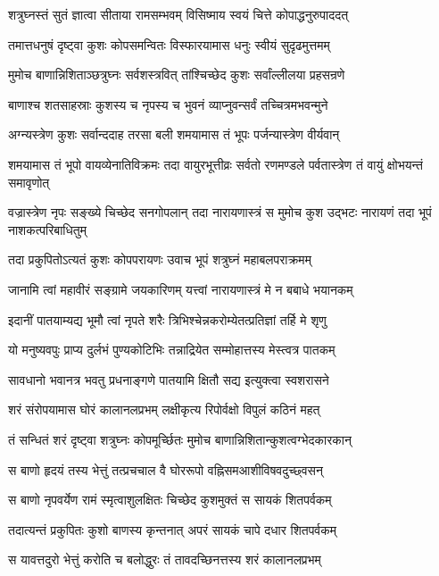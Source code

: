 \twolineshloka
{शत्रुघ्नस्तं सुतं ज्ञात्वा सीताया रामसम्भवम्}
{विसिष्माय स्वयं चित्ते कोपाद्धनुरुपाददत्}%

\twolineshloka
{तमात्तधनुषं दृष्ट्वा कुशः कोपसमन्वितः}
{विस्फारयामास धनुः स्वीयं सुदृढमुत्तमम्}%

\twolineshloka
{मुमोच बाणान्निशिताञ्छत्रुघ्नः सर्वशस्त्रवित्}
{तांश्चिच्छेद कुशः सर्वांल्लीलया प्रहसन्रणे}%

\twolineshloka
{बाणाश्च शतसाहस्राः कुशस्य च नृपस्य च}
{भुवनं व्याप्नुवन्सर्वं तच्चित्रमभवन्मुने}%

\twolineshloka
{अग्न्यस्त्रेण कुशः सर्वान्ददाह तरसा बली}
{शमयामास तं भूपः पर्जन्यास्त्रेण वीर्यवान्}%


\threelineshloka
{शमयामास तं भूपो वायव्येनातिविक्रमः}
{तदा वायुरभूत्तीव्रः सर्वतो रणमण्डले}
{पर्वतास्त्रेण तं वायुं क्षोभयन्तं समावृणोत्}%

\threelineshloka
{वज्रास्त्रेण नृपः सङ्ख्ये चिच्छेद सनगोपलान्}
{तदा नारायणास्त्रं स मुमोच कुश उद्भटः}
{नारायणं तदा भूपं नाशकत्परिबाधितुम्}%

\twolineshloka
{तदा प्रकुपितोऽत्यतं कुशः कोपपरायणः}
{उवाच भूपं शत्रुघ्नं महाबलपराक्रमम्}%

\twolineshloka
{जानामि त्वां महावीरं सङ्ग्रामे जयकारिणम्}
{यत्त्वां नारायणास्त्रं मे न बबाधे भयानकम्}%

\twolineshloka
{इदानीं पातयाम्यद्य भूमौ त्वां नृपते शरैः}
{त्रिभिश्चेन्नकरोम्येतत्प्रतिज्ञां तर्हि मे शृणु}%

\twolineshloka
{यो मनुष्यवपुः प्राप्य दुर्लभं पुण्यकोटिभिः}
{तन्नाद्रियेत सम्मोहात्तस्य मेस्त्वत्र पातकम्}%

\twolineshloka
{सावधानो भवानत्र भवतु प्रधनाङ्गणे}
{पातयामि क्षितौ सद्य इत्युक्त्वा स्वशरासने}%

\twolineshloka
{शरं संरोपयामास घोरं कालानलप्रभम्}
{लक्षीकृत्य रिपोर्वक्षो विपुलं कठिनं महत्}%

\twolineshloka
{तं सन्धितं शरं दृष्ट्वा शत्रुघ्नः कोपमूर्च्छितः}
{मुमोच बाणान्निशितान्कुशत्वग्भेदकारकान्}%

\twolineshloka
{स बाणो हृदयं तस्य भेत्तुं तत्प्रचचाल वै}
{घोररूपो वह्निसमआशीविषवदुच्छ्वसन्}%

\twolineshloka
{स बाणो नृपवर्येण रामं स्मृत्वाशुलक्षितः}
{चिच्छेद कुशमुक्तं स सायकं शितपर्वकम्}%

\twolineshloka
{तदात्यन्तं प्रकुपितः कुशो बाणस्य कृन्तनात्}
{अपरं सायकं चापे दधार शितपर्वकम्}%

\twolineshloka
{स यावत्तदुरो भेत्तुं करोति च बलोद्धुरः}
{तं तावदच्छिनत्तस्य शरं कालानलप्रभम्}%

